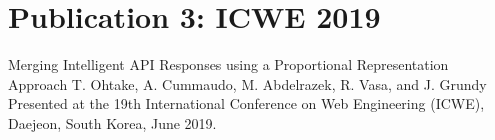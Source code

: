 \chapter{Publication 3: ICWE 2019}

{Merging Intelligent API Responses using a Proportional Representation Approach}
{T. Ohtake, A. Cummaudo, M. Abdelrazek, R. Vasa, and J. Grundy}
{Presented at the 19th International Conference on Web Engineering (ICWE), Daejeon, South Korea, June 2019.}
